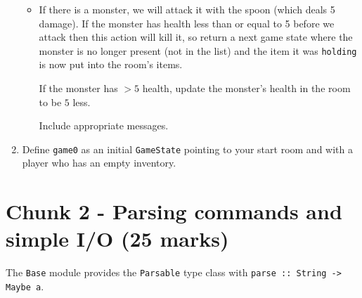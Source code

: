 \documentclass{article}
\newcommand{\topMarks}[1]{\marginnote{(#1 marks)}}
\begin{document}
\begin{enumerate}
\begin{itemize}
  \item If there is a monster, we will attack it with the spoon (which
    deals 5 damage). If the monster has health less than or equal to 5
    before we attack then this action will kill it, so
    return a next game state where the monster is no longer present (not in the list) and
    the item it was \texttt{holding} is now put into the room's items.

    If the monster has $> 5$ health, update the monster's health in the
    room to be $5$ less.

    Include appropriate messages.
\end{itemize}

\item \topMarks{3} Define \texttt{game0} as an initial \texttt{GameState} pointing to your
start room and with a player who has an empty inventory.
\end{enumerate}

\newpage

\section*{Chunk 2 - Parsing commands and simple I/O (25 marks)}

The \texttt{Base} module provides the \texttt{Parsable} type class
with \texttt{parse :: String -> Maybe a}.
\end{document}
